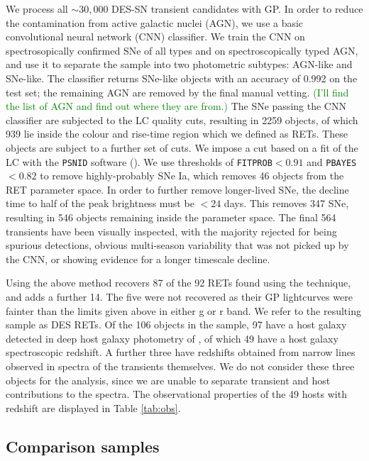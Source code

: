 \documentclass[fleqn,usenatbib,]{mnras}
\begin{document}
We process all $\sim 30,000$ DES-SN transient candidates with GP. In order to reduce the contamination from active galactic nuclei (AGN), we use a basic convolutional neural network (CNN) classifier. We train the CNN on spectrosopically confirmed SNe of all types and on spectroscopically typed AGN, and use it to separate the sample into two photometric subtypes: AGN-like and SNe-like. The classifier returns SNe-like objects with an accuracy of 0.992 on the test set; the remaining AGN are removed by the final manual vetting. \textcolor{green}{(I'll find the list of AGN and find out where they are from.)}
The SNe passing the CNN classifier are subjected to the LC quality cuts, resulting in 2259 objects, of which 939 lie inside the colour and rise-time region which we defined as RETs. These objects are subject to a further set of cuts. We impose a cut based on a fit of the LC with the \texttt{PSNID} software (\citet{Sako2008}). We use thresholds of \texttt{FITPROB}$<0.91$ and \texttt{PBAYES}$<0.82$ to remove highly-probably SNe Ia, which removes 46 objects from the RET parameter space. In order to further remove longer-lived SNe, the decline time to half of the peak brightness must be $<24$ days. This removes 347 SNe, resulting in 546 objects remaining inside the parameter space. The final 564 transients have been visually inspected, with the majority rejected for being spurious detections, obvious multi-season variability that was not picked up by the CNN, or showing evidence for a longer timescale decline. 

Using the above method recovers 87 of the 92 RETs found using the  technique, and adds a further 14. The five were not recovered as their GP lightcurves were fainter than the limits given above in either g or r band.
We refer to the resulting sample as DES RETs. Of the 106 objects in the sample, 97 have a host galaxy detected in deep host galaxy photometry of \citet{Wiseman2020}, of which 49 have a host galaxy spectroscopic redshift. A further three have redshifts obtained from narrow lines observed in spectra of the transients themselves. We do not consider these three objects for the analysis, since we are unable to separate transient and host contributions to the spectra. The observational properties of the 49 hosts with redshift are displayed in Table \ref{tab:obs}.

\subsection{Comparison samples \label{subsec:comparison}}
\end{document}
